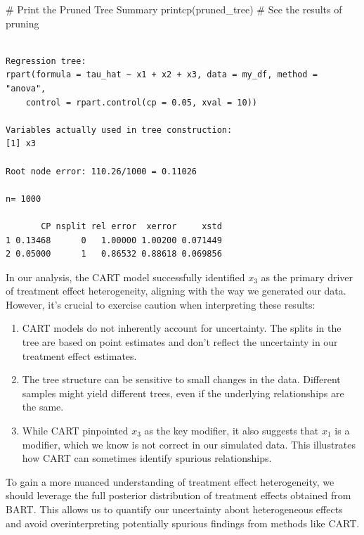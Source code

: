 \documentclass[
  letterpaper,
  DIV=11,
  numbers=noendperiod]{scrreprt}
\newenvironment{Shaded}{\begin{snugshade}}{\end{snugshade}}
\newcommand{\CommentTok}[1]{\textcolor[rgb]{0.37,0.37,0.37}{#1}}
\newcommand{\FunctionTok}[1]{\textcolor[rgb]{0.28,0.35,0.67}{#1}}
\newcommand{\NormalTok}[1]{\textcolor[rgb]{0.00,0.23,0.31}{#1}}
\providecommand{\tightlist}{%
  \setlength{\itemsep}{0pt}\setlength{\parskip}{0pt}}\usepackage{longtable,booktabs,array}
\begin{document}
\begin{Shaded}
\begin{Highlighting}[]
\CommentTok{\# Print the Pruned Tree Summary}
\FunctionTok{printcp}\NormalTok{(pruned\_tree)  }\CommentTok{\# See the results of pruning}
\end{Highlighting}
\end{Shaded}

\begin{verbatim}

Regression tree:
rpart(formula = tau_hat ~ x1 + x2 + x3, data = my_df, method = "anova", 
    control = rpart.control(cp = 0.05, xval = 10))

Variables actually used in tree construction:
[1] x3

Root node error: 110.26/1000 = 0.11026

n= 1000 

       CP nsplit rel error  xerror     xstd
1 0.13468      0   1.00000 1.00200 0.071449
2 0.05000      1   0.86532 0.88618 0.069856
\end{verbatim}

In our analysis, the CART model successfully identified \(x_3\) as the
primary driver of treatment effect heterogeneity, aligning with the way
we generated our data. However, it's crucial to exercise caution when
interpreting these results:

\begin{enumerate}
\def\labelenumi{\arabic{enumi}.}
\tightlist
\item
  CART models do not inherently account for uncertainty. The splits in
  the tree are based on point estimates and don't reflect the
  uncertainty in our treatment effect estimates.
\item
  The tree structure can be sensitive to small changes in the data.
  Different samples might yield different trees, even if the underlying
  relationships are the same.
\item
  While CART pinpointed \(x_3\) as the key modifier, it also suggests
  that \(x_1\) is a modifier, which we know is not correct in our
  simulated data. This illustrates how CART can sometimes identify
  spurious relationships.
\end{enumerate}

To gain a more nuanced understanding of treatment effect heterogeneity,
we should leverage the full posterior distribution of treatment effects
obtained from BART. This allows us to quantify our uncertainty about
heterogeneous effects and avoid overinterpreting potentially spurious
findings from methods like CART.
\end{document}

